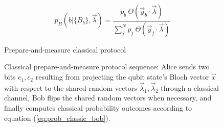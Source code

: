 \begin{equation}\label{eq:prob_classic_bob}
p_B(b|\{B_b\},\vec{\lambda}) = \frac{p_b\ \Theta(\vec{y}_b \cdot \vec{\lambda})}{\sum_{j}^{N}p_j\ \Theta(\vec{y}_j \cdot \vec{\lambda})}
\end{equation}

\begin{figure}[tb]
\begin{center}
\begin{msc}[msc keyword=, instance width=3.6 cm]{Prepare-and-measure classical protocol}
\nextlevel[3]
\nextlevel[3]
\nextlevel[1]
\nextlevel[3]
\nextlevel[2]
\end{msc}
\end{center}
\caption{Classical prepare-and-measure protocol sequence: Alice sends two bits $c_1, c_2$ resulting from projecting the qubit state's Bloch vector $\vec{x}$ with respect to the shared random vectors $\vec{\lambda}_1, \vec{\lambda}_2$ through a classical channel, Bob flips the shared random vectors when necessary, and finally computes classical probability outcomes according to equation (\ref{eq:prob_classic_bob}).}
\label{fig:msc_pm}
\end{figure}




